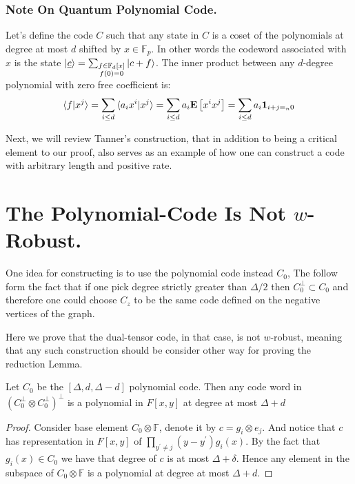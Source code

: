 \documentclass[manuscript,screen,review]{acmart}
\begin{document}
\subsubsection{Note On Quantum Polynomial Code.} 
Let's define the code $C$ such that any state in $C$ is a coset of the polynomials at degree at most $d$ shifted by $x \in \mathbb{F}_{p}$. In other words the codeword associated with $x$ is the state $\ket{\underline{c}} = \sum_{ \substack{ f \in \mathbb{F}_{d}[x] \\  f(0) = 0}}{ \ket{ c + f}} $. The inner product between any $d$-degree polynomial with zero free coefficient is:
\begin{equation*}
  \begin{split}
    \braket{ f | x^{j} } = \sum_{i \le d }{ \braket{a_{i} x^{i} | x^{j}}} = \sum_{i \le d}{ a_{i} \mathbf{E} \left[ { x^{i}x^{j}   } \right]} =  \sum_{i \le d}{ a_{i } \mathbf{1}_{ i + j =_{n} 0 }}
  \end{split}
\end{equation*}


Next, we will review Tanner's construction, that in addition to being a critical element to our proof, also serves as an example of how one can construct a code with arbitrary length and positive rate.


\section{The Polynomial-Code Is Not $w$-Robust.}
One idea for constructing is to use the polynomial code instead $C_{0}$, The follow form the fact that if one pick degree strictly greater than $\Delta/2$ then $C_{0}^{\perp} \subset C_{0}$ and therefore one could choose $C_{z}$ to be the same code defined on the negative vertices of the graph. 

Here we prove that the dual-tensor code, in that case, is not $w$-robust, meaning that any such construction should be consider other way for proving the reduction Lemma.  

\begin{claim}
  \label{claim:poldu}
  Let $C_{0}$ be the $[\Delta,d, \Delta-d]$ polynomial code. Then any code word in $\left( C_{0}^{\perp} \otimes C_{0}^{\perp} \right)^{\perp}$ is a polynomial in $F[x,y]$ at degree at most $\Delta + d$
\end{claim}
\begin{proof}
Consider base element $ C_{0} \otimes \mathbb{F} $, denote it by $c = g_{i} \otimes e_{j}$. And notice that $c$ has representation in $F[x,y]$ of $\prod_{y^{\prime} \neq j}{\left( y - y^{\prime} \right) }g_{i}\left( x \right)$. By the fact that $g_{i}\left( x \right) \in C_{0} $ we have that degree of $c$ is at most $\Delta + \delta$. Hence any element in the subspace of $C_{0} \otimes \mathbb{F}$ is a polynomial at degree at most $\Delta + d$.   
\end{proof}
\end{document}

